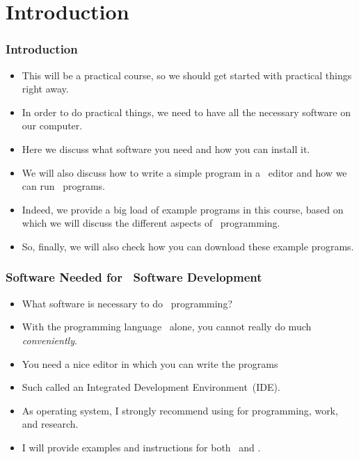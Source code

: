 \documentclass[aspectratio=169,mathserif,notheorems]{beamer}%
\subtitle{Getting Started}%
\begin{document}
%
\startPresentation%
%
\section{Introduction}%
%
\begin{frame}%
\frametitle{Introduction}%
\begin{itemize}%
\item This will be a practical course, so we should get started with practical things right away.%
\item<2-> In order to do practical things, we need to have all the necessary software on our computer.%
\item<3-> Here we discuss what software you need and how you can install it.%
\item<4-> We will also discuss how to write a simple program in a \python\ editor and how we can run \python\ programs.%
\item<5-> Indeed, we provide a big load of example programs in this course, based on which we will discuss the different aspects of \python\ programming.%
\item<6-> So, finally, we will also check how you can download these example programs.%
\end{itemize}%
\end{frame}%
%
\begin{frame}%
\frametitle{Software Needed for \python\ Software Development}%
\begin{itemize}%
\item What software is necessary to do \python\ programming?%
\item<4-> With the programming language \python\ alone, you cannot really do much \emph{conveniently}.%
\item<5-> You need a nice editor in which you can write the programs%
\item<8-> Such  called an Integrated Development Environment~(IDE).%
\item<11-> As operating system, I strongly recommend using \linux\cite{T1999TLE,B2022ELATCL,H2022LML} for programming, work, and research.%
%
\item<13-> I will provide examples and instructions for both \ubuntu\ and \microsoftWindows\cite{B2023W1IO}.%
\end{itemize}%
\end{frame}%
%
\end{document}
